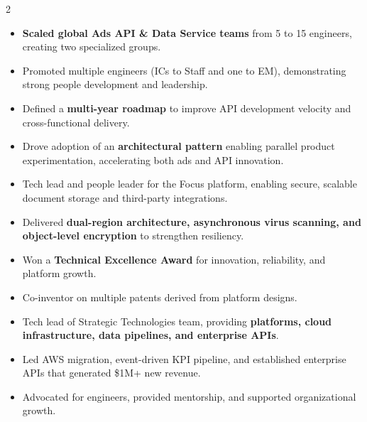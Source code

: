 \documentclass[10pt,a4paper,ragged2e,withhyper]{altacv}
\begin{document}
\begin{paracol}{2}
\begin{itemize}
    \item \textbf{Scaled global Ads API \& Data Service teams} from 5 to 15 engineers, creating two specialized groups.
    \item Promoted multiple engineers (ICs to Staff and one to EM), demonstrating strong people development and leadership.
    \item Defined a \textbf{multi-year roadmap} to improve API development velocity and cross-functional delivery.
    \item Drove adoption of an \textbf{architectural pattern} enabling parallel product experimentation, accelerating both ads and API innovation.
\end{itemize}


\divider{}

\begin{itemize}
    \item Tech lead and people leader for the Focus platform, enabling secure, scalable document storage and third-party integrations.
    \item Delivered \textbf{dual-region architecture, asynchronous virus scanning, and object-level encryption} to strengthen resiliency.
    \item Won a \textbf{Technical Excellence Award} for innovation, reliability, and platform growth.
    \item Co-inventor on multiple patents derived from platform designs.
\end{itemize}


\divider{}

\begin{itemize}
    \item Tech lead of Strategic Technologies team, providing \textbf{platforms, cloud infrastructure, data pipelines, and enterprise APIs}.
    \item Led AWS migration, event-driven KPI pipeline, and established enterprise APIs that generated \$1M+ new revenue.
    \item Advocated for engineers, provided mentorship, and supported organizational growth.
\end{itemize}


\end{paracol}
\end{document}
